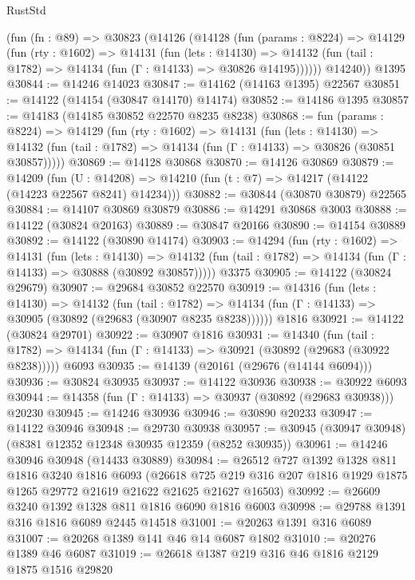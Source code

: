 \begin{lexlean}{RustStd}
\begin{coremodule}
    (fun (fn : @89) =>
    @30823
      (@14126
        (@14128
          (fun (params : @8224) =>
          @14129
            (fun (rty : @1602) =>
            @14131
              (fun (lets : @14130) =>
              @14132 (fun (tail : @1782) => @14134 (fun (Γ : @14133) => @30826 @14195))))))
        @14240))
    @1395
@30844 := @14246 @14023
@30847 := @14162 (@14163 @1395) @22567
@30851 := @14122 (@14154 (@30847 @14170) @14174)
@30852 := @14186 @1395
@30857 := @14183 (@14185 @30852 @22570 @8235 @8238)
@30868 := fun (params : @8224) =>
  @14129
    (fun (rty : @1602) =>
    @14131
      (fun (lets : @14130) =>
      @14132 (fun (tail : @1782) => @14134 (fun (Γ : @14133) => @30826 (@30851 @30857)))))
@30869 := @14128 @30868
@30870 := @14126 @30869
@30879 := @14209
    (fun (U : @14208) => @14210 (fun (t : @7) => @14217 (@14122 (@14223 @22567 @8241) @14234)))
@30882 := @30844 (@30870 @30879) @22565
@30884 := @14107 @30869 @30879
@30886 := @14291 @30868 @3003
@30888 := @14122 (@30824 @20163)
@30889 := @30847 @20166
@30890 := @14154 @30889
@30892 := @14122 (@30890 @14174)
@30903 := @14294
    (fun (rty : @1602) =>
    @14131
      (fun (lets : @14130) =>
      @14132 (fun (tail : @1782) => @14134 (fun (Γ : @14133) => @30888 (@30892 @30857)))))
    @3375
@30905 := @14122 (@30824 @29679)
@30907 := @29684 @30852 @22570
@30919 := @14316
    (fun (lets : @14130) =>
    @14132
      (fun (tail : @1782) =>
      @14134 (fun (Γ : @14133) => @30905 (@30892 (@29683 (@30907 @8235 @8238))))))
    @1816
@30921 := @14122 (@30824 @29701)
@30922 := @30907 @1816
@30931 := @14340
    (fun (tail : @1782) => @14134 (fun (Γ : @14133) => @30921 (@30892 (@29683 (@30922 @8238)))))
    @6093
@30935 := @14139 (@20161 (@29676 (@14144 @6094)))
@30936 := @30824 @30935
@30937 := @14122 @30936
@30938 := @30922 @6093
@30944 := @14358 (fun (Γ : @14133) => @30937 (@30892 (@29683 @30938))) @20230
@30945 := @14246 @30936
@30946 := @30890 @20233
@30947 := @14122 @30946
@30948 := @29730 @30938
@30957 := @30945 (@30947 @30948) (@8381 @12352 @12348 @30935 @12359 (@8252 @30935))
@30961 := @14246 @30946 @30948 (@14433 @30889)
@30984 := @26512
    @727
    @1392
    @1328
    @811
    @1816
    @3240
    @1816
    @6093
    (@26618 @725 @219 @316 @207 @1816 @1929 @1875 @1265 @29772 @21619 @21622 @21625 @21627 @16503)
@30992 := @26609 @3240 @1392 @1328 @811 @1816 @6090 @1816 @6003
@30998 := @29788 @1391 @316 @1816 @6089 @2445 @14518
@31001 := @20263 @1391 @316 @6089
@31007 := @20268 @1389 @141 @46 @14 @6087 @1802
@31010 := @20276 @1389 @46 @6087
@31019 := @26618 @1387 @219 @316 @46 @1816 @2129 @1875 @1516 @29820

\end{coremodule}
\end{lexlean}

